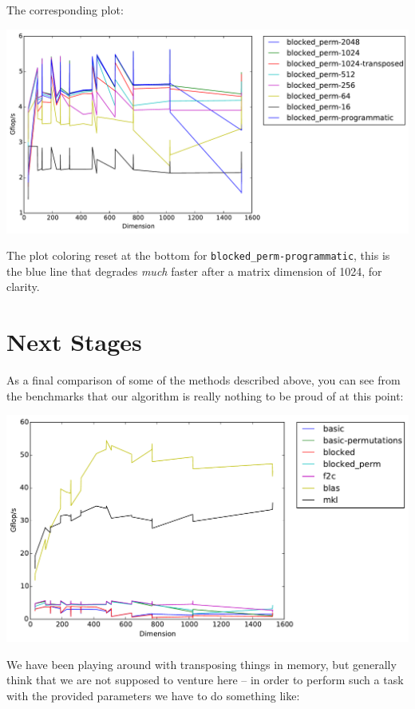 \documentclass[11pt]{article}
\begin{document}
\noindent The corresponding plot:
\begin{center}
    \includegraphics[scale=0.5]{benchmarking/blocked/timing.pdf}
\end{center}

\noindent The plot coloring reset at the bottom for \texttt{blocked\_perm-programmatic}, this is the blue line that degrades \emph{much} faster after a matrix dimension of 1024, for clarity.

\section{Next Stages}

\noindent As a final comparison of some of the methods described above, you can see from the benchmarks that our algorithm is really nothing to be proud of at this point:

\begin{center}
    \includegraphics[scale=0.5]{benchmarking/comparison/timing.pdf}
\end{center}

\noindent We have been playing around with transposing things in memory, but generally think that we are not supposed to venture here -- in order to perform such a task with the provided parameters we have to do something like:
\end{document}
